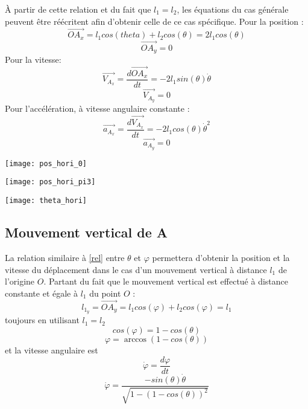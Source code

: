 \documentclass{udes_rapport} %
\begin{document}
À partir de cette relation et du fait que $l_1 = l_2$, les équations du cas générale peuvent être réécritent afin d'obtenir celle de ce cas spécifique.
Pour la position :
\[	\overrightarrow{OA_x} = l_1 cos(theta) + l_2cos(\theta) = 2 l_1 cos(\theta)	\]
\[	\overrightarrow{OA_y} = 0	\]
Pour la vitesse:
\[	\overrightarrow{V_{A_x}} = \frac{d\overrightarrow{OA_x}}{dt}= -2 l_1 sin(\theta)\dot{\theta}	\]
\[	\overrightarrow{V_{A_y}} = 0 \]
Pour l'accélération, à vitesse angulaire constante :
\[	\overrightarrow{a_{A_x}} = \frac{d\overrightarrow{V_{A_x}}}{dt}= -2 l_1 cos(\theta)\dot{\theta}^2	\]
\[	\overrightarrow{a_{A_y}} = 0\]


\noindent\begin{minipage}{\textwidth} 
\begin{minipage}{0.5\textwidth}
  \centering
  \texttt{[image: pos\_hori\_0]}
  \label{pos_hori:position_horizontal_initiale}
\end{minipage}%
\begin{minipage}{0.5\textwidth}
  \centering 
  \texttt{[image: pos\_hori\_pi3]} 
  \label{pos_hori:position_horizontal_finale} 
\end{minipage} 
\label{pos_hori} 
\end{minipage}


\begin{center}
	\centering
	\texttt{[image: theta\_hori]}
	\label{composantes_horizontale_theta}
\end{center}

\subsection{Mouvement vertical de A}
La relation similaire à \eqref{rel} entre $\theta$ et $\varphi$ permettera d'obtenir la position et la vitesse du déplacement dans le cas d'un mouvement vertical à distance $l_1$ de l'origine $O$.
Partant du fait que le mouvement vertical est effectué à distance constante et égale à $l_1$ du point $O$ :
\begin{equation}
l_{1_y} = \overrightarrow{OA_y} = l_1 cos(\varphi) + l_2 cos(\varphi) = l_1 
\end{equation}
toujours en utilisant $l_1 = l_2$
\[ 	cos(\varphi) = 1- cos(\theta)	\]
\[ 	\varphi = \arccos(1- cos(\theta))	\]
et la vitesse angulaire est 
\[	\dot{\varphi} = \frac{d\varphi}{dt}\]
\[ 	\dot{\varphi} =\frac{-sin(\theta)\dot\theta}{\sqrt{1-(1-cos(\theta))^2}}\]
\end{document}
